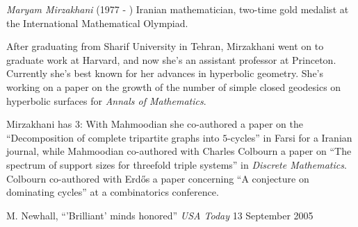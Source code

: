 \documentclass[12pt]{article}
\begin{document}
\emph{Maryam Mirzakhani} (1977 - ) Iranian mathematician, two-time gold medalist at the International Mathematical Olympiad.

After graduating from Sharif University in Tehran, Mirzakhani went on to graduate work at Harvard, and now she's an assistant professor at Princeton. Currently she's best known for her advances in hyperbolic geometry. She's working on a paper on the growth of the number of simple closed geodesics on hyperbolic surfaces for {\it Annals of Mathematics}.

Mirzakhani has  3: With Mahmoodian she co-authored a paper on the ``Decomposition of complete tripartite graphs into $5$-cycles'' in Farsi for a Iranian journal, while Mahmoodian co-authored with Charles Colbourn a paper on ``The spectrum of support sizes for threefold triple systems'' in {\it Discrete Mathematics}. Colbourn co-authored with Erd\H{o}s a paper concerning ``A conjecture on dominating cycles'' at a combinatorics conference.

\begin{thebibliography}{1}
 M. Newhall, ``'Brilliant' minds honored'' {\it USA Today} 13 September 2005
\end{thebibliography}
\end{document}

